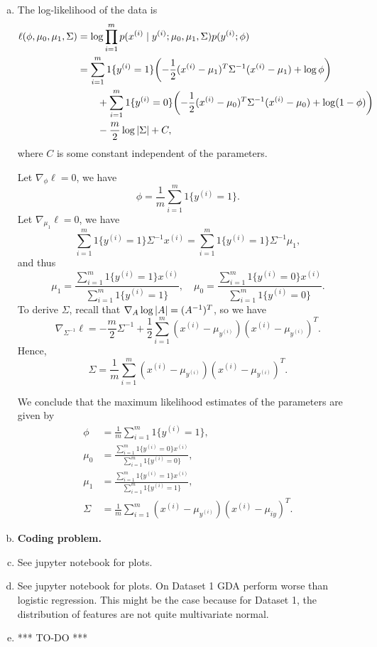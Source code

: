 \documentclass[12pt,letterpaper,boxed]{hmcpset}
\newcommand{\yy}{y^{(i)}}
\newcommand{\xx}{x^{(i)}}
\begin{document}
\begin{solution}
\begin{enumerate}[(a)]
  \item The log-likelihood of the data is
  \[
  \begin{aligned}
      \ell(\phi, \mu_0, \mu_1, \Sigma) &= \log \prod_{i=1}^m p(\xx \mid \yy; \mu_0, \mu_1, \Sigma) p(\yy; \phi) \\
      &= \sum_{i=1}^m 1\{\yy=1\} \qty(-\frac{1}{2} (\xx-\mu_1)^T \Sigma^{-1} (\xx-\mu_1) + \log \phi) \\
      & \qquad + \sum_{i=1}^m 1\{\yy=0\} \qty(-\frac{1}{2} (\xx-\mu_0)^T \Sigma^{-1} (\xx-\mu_0) + \log (1-\phi))  \\
      & \qquad - \frac{m}{2} \log \abs{\Sigma} +  C,
  \end{aligned}
  \]
  where $C$ is some constant independent of the parameters.
  
  Let $\nabla_\phi \ell = 0$, we have
  \[
  \phi = \frac{1}{m} \sum_{i=1}^m 1\{\yy=1\}.
  \]
  Let $\nabla_{\mu_1} \ell = 0$, we have
  \[
  \sum_{i=1}^m 1\{\yy=1\} \Sigma^{-1}\xx = \sum_{i=1}^m 1\{\yy=1\} \Sigma^{-1} \mu_1,
  \]
  and thus
  \[
  \mu_1 = \frac{\sum_{i=1}^m 1\{\yy=1\} \xx}{\sum_{i=1}^m 1\{\yy=1\}}, \quad 
  \mu_0 = \frac{\sum_{i=1}^m 1\{\yy=0\} \xx}{\sum_{i=1}^m 1\{\yy=0\}}.
  \]
  To derive $\Sigma$, recall that $\nabla_{A} \log \left\lvert A\right\rvert = (A^{-1})^T$, so we have
  \[
  \nabla_{\Sigma^{-1}} \ell = -\frac{m}{2} \Sigma^{-1} + \frac{1}{2}\sum_{i=1}^m (\xx - \mu_{\yy})(\xx-\mu_{\yy})^T.
  \]
  Hence,
  \[
  \Sigma = \frac{1}{m} \sum_{i=1}^m (\xx - \mu_{\yy})(\xx-\mu_{\yy})^T.
  \]
  
  We conclude that the maximum likelihood estimates of the parameters are given by
  \[
  \begin{aligned}
  	\phi &= \frac{1}{m} \sum_{i=1}^m 1\{\yy = 1\}, \\
  	\mu_0 &= \frac{\sum_{i=1}^{m} 1\{\yy = 0\} \xx }{\sum_{i=1}^m 1\{\yy = 0\}}, \\
  	\mu_1 &= \frac{\sum_{i=1}^{m} 1\{\yy = 1\} \xx }{\sum_{i=1}^m 1\{\yy = 1\}} ,\\ 
  	\Sigma &= \frac{1}{m} \sum_{i=1}^m (\xx - \mu_{\yy})(\xx - \mu_{iy})^T.
  \end{aligned}
  \]
    
  \item \textbf{Coding problem.}
  
  \item See jupyter notebook for plots.
  
  \item See jupyter notebook for plots. On Dataset 1 GDA perform worse than logistic regression. This might be the case because for Dataset 1, the distribution of features are not quite multivariate normal.
  
  \item *** TO-DO ***
    
\end{enumerate}
\end{solution}
\end{document}
